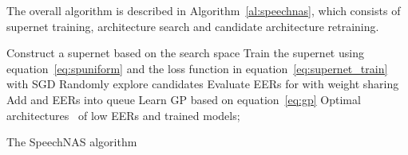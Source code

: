 \documentclass{article}
\begin{document}
The overall algorithm is described in Algorithm~\ref{al:speechnas}, which consists of supernet training, architecture search and candidate architecture retraining.
\begin{algorithm}[t]
\SetAlgoLined
{}
 Construct a supernet based on the search space \;
 Train the supernet using equation~\eqref{eq:spuniform} and the loss function in equation~\eqref{eq:supernet_train} with SGD\;
 Randomly explore  candidates  
 Evaluate EERs for  with weight sharing\;
 Add  and EERs into queue \;
 Learn GP based on equation~\eqref{eq:gp}\;
 \Return Optimal architectures \ of low EERs and trained models;
 \caption{The SpeechNAS algorithm}\label{al:speechnas}
\end{algorithm}
\end{document}
